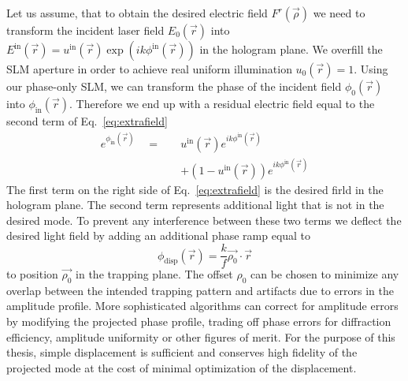 Let us assume, that to obtain the desired electric field $F^{r}(\vec{\rho})$ we need to transform the incident laser field $E_{0}(\vec{r})$ into $E^{\mathrm{in}}(\vec{r}) = u^{\mathrm{in}}(\vec{r})\exp (ik\phi ^{\mathrm{in}}(\vec{r}))$ in the hologram plane. We overfill the SLM aperture in order to achieve real uniform illumination $u_{0}(\vec{r}) = 1$. Using our phase-only SLM, we can transform the phase of the incident field $\phi _{0}(\vec{r})$ into $\phi _{\mathrm{in}}(\vec{r})$. Therefore we end up with a residual electric field equal to the second term of Eq.~\eqref{eq:extrafield}
\begin{subequations}
\label{eq:extrafield}
\begin{align}
e^{\phi _{\mathrm{in}}(\vec{r})} \quad = \quad & u^{\mathrm{in}}(\vec{r}) e^{ik\phi ^{\mathrm{in}}(\vec{r})} \\
											&  + \left( 1- u^{\mathrm{in}}(\vec{r})\right) e^{ik\phi ^{\mathrm{in}}(\vec{r})}
\end{align}
\end{subequations}
The first term on the right side of Eq.~\eqref{eq:extrafield} is the desired firld in the hologram plane. The second term represents additional light that is not in the desired mode. To prevent any interference between these two terms we deflect the desired light field by adding an additional phase ramp \cite{CURTIS2002169} equal to
\begin{equation}
\phi _{\mathrm{disp}}(\vec{r}) = \frac{k}{f}\vec{\rho _{0}}\cdot \vec{r}
\end{equation}
to position $\vec{\rho _{0}}$ in the trapping plane. The offset $\rho _{0}$ can be chosen to minimize any overlap between the intended trapping pattern and artifacts due to errors in the amplitude profile. More sophisticated algorithms can correct for amplitude errors by modifying the projected phase profile, trading off phase errors for diffraction efficiency, amplitude uniformity or other figures of merit. For the purpose of this thesis, simple displacement is sufficient and conserves high fidelity of the projected mode at the cost of minimal optimization of the displacement.




